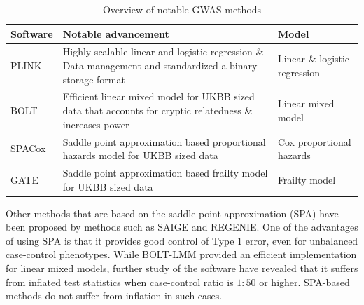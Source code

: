 \begin{table}[h]
	\centering
	\begin{tabularx}{\textwidth}{l X l}
		\hline
		Software	&	Notable advancement		&	Model \\
		\hline
		PLINK\cite{chang2015second,purcell2007plink}	&
		Highly scalable linear and logistic regression \& Data management and standardized a binary storage format	&
		Linear \& logistic regression	\\
		BOLT\cite{loh2015efficient}	&
		Efficient linear mixed model for UKBB sized data that accounts for cryptic relatedness \& increases power	&
		Linear mixed model	\\
		SPACox\cite{bi2020fast}	&	
		Saddle point approximation based proportional hazards model for UKBB sized data &
		Cox proportional hazards \\
		GATE\cite{dey2022efficient}	&
		Saddle point approximation based frailty model for UKBB sized data	&
		Frailty model \\
		\hline
	\end{tabularx}
	\caption{Overview of notable GWAS methods}
	\label{table:GWASoverview}
\end{table}
Other methods that are based on the saddle point approximation (SPA)\cite{daniels1954saddlepoint,kuonen1999miscellanea} have been proposed by methods such as SAIGE\cite{zhou2018efficiently} and REGENIE\cite{mbatchou2021computationally}. One of the advantages of using SPA is that it provides good control of Type 1 error, even for unbalanced case-control phenotypes. While BOLT-LMM provided an efficient implementation for linear mixed models, further study of the software have revealed that it suffers from inflated test statistics when case-control ratio is $ 1:50 $ or higher. SPA-based methods do not suffer from inflation in such cases\cite{mbatchou2021computationally}.

